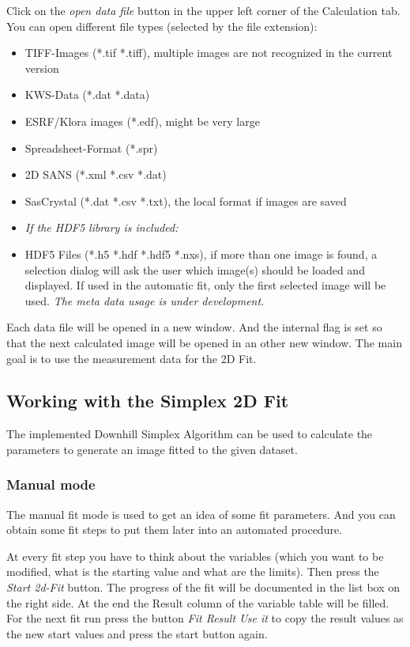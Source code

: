 \documentclass[11pt]{article} %
\begin{document}
Click on the {\it open data file} button in the upper left corner of the Calculation tab. You can open different file types (selected by the file extension):
	\begin{itemize}\itemsep0pt
	\item TIFF-Images (*.tif *.tiff), multiple images are not recognized in the current version
	\item KWS-Data (*.dat *.data)
	\item ESRF/Klora images (*.edf), might be very large
	\item Spreadsheet-Format (*.spr)
	\item 2D SANS (*.xml *.csv *.dat)
	\item SasCrystal (*.dat *.csv *.txt), the local format if images are saved
	\item[] {\it If the HDF5 library is included:}
	\item HDF5 Files (*.h5 *.hdf *.hdf5 *.nxs), if more than one image is found, a selection dialog will ask the user which image(s) should be loaded and displayed. If used in the automatic fit, only the first selected image will be used. {\it The meta data usage is under development.}
	\end{itemize}
Each data file will be opened in a new window. And the internal flag is set so that the next calculated image will be opened in an other new window. The main goal is to use the measurement data for the 2D Fit.

\subsection{Working with the Simplex 2D Fit}

The implemented Downhill Simplex Algorithm can be used to calculate the parameters to generate an image fitted to the given dataset.

\subsubsection{Manual mode}

The manual fit mode is used to get an idea of some fit parameters. And you can obtain some fit steps to put them later into an automated procedure.

At every fit step you have to think about the variables (which you want to be modified, what is the starting value and what are the limits). Then press the {\it Start 2d-Fit} button. The progress of the fit will be documented in the list box on the right side. At the end the Result column of the variable table will be filled. For the next fit run press the button {\it Fit Result Use it} to copy the result values as the new start values and press the start button again.
\end{document}
